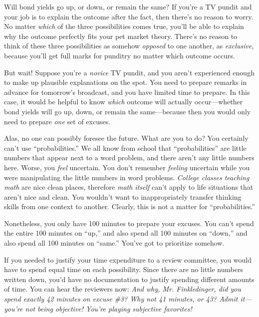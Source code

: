 
{
 Will bond yields go up, or down, or remain the same? If
you're a TV pundit and your job is to explain the
outcome after the fact, then there's no reason to
worry. No matter \textit{which} of the three possibilities comes true,
you'll be able to explain why the outcome perfectly
fits your pet market theory. There's no reason to think
of these three possibilities as somehow \textit{opposed} to one
another, as \textit{exclusive}, because you'll get full
marks for punditry no matter which outcome occurs. }

{
 But wait! Suppose you're a \textit{novice} TV
pundit, and you aren't experienced enough to make up
plausible explanations on the spot. You need to prepare remarks in
advance for tomorrow's broadcast, and you have limited
time to prepare. In this case, it would be helpful to know
\textit{which} outcome will actually occur---whether bond yields will
go up, down, or remain the same---because then you would only need to
prepare \textit{one} set of excuses.}

{
 Alas, no one can possibly foresee the future. What are you to do?
You certainly can't use
``probabilities.'' We all know from
school that ``probabilities'' are
little numbers that appear next to a word problem, and there
aren't any little numbers here. Worse, you
\textit{feel} uncertain. You don't remember
\textit{feeling} uncertain while you were manipulating the little
numbers in word problems. \textit{College classes teaching math} are
nice clean places, therefore \textit{math itself} can't
apply to life situations that aren't nice and clean.
You wouldn't want to inappropriately transfer thinking
skills from one context to another. Clearly, this is not a matter for
``probabilities.''}

{
 Nonetheless, you only have 100 minutes to prepare your excuses.
You can't spend the entire 100 minutes on
``up,'' and also spend all 100
minutes on ``down,'' and also spend
all 100 minutes on ``same.''
You've got to prioritize somehow.}

{
 If you needed to justify your time expenditure to a review
committee, you would have to spend equal time on each possibility.
Since there are no little numbers written down, you'd
have no documentation to justify spending different amounts of time.
You can hear the reviewers now: \textit{And why, Mr. Finkledinger, did
you spend exactly 42 minutes on excuse \#3? Why not 41 minutes, or 43?
Admit it---you're not being objective!
You're playing subjective favorites!}}

